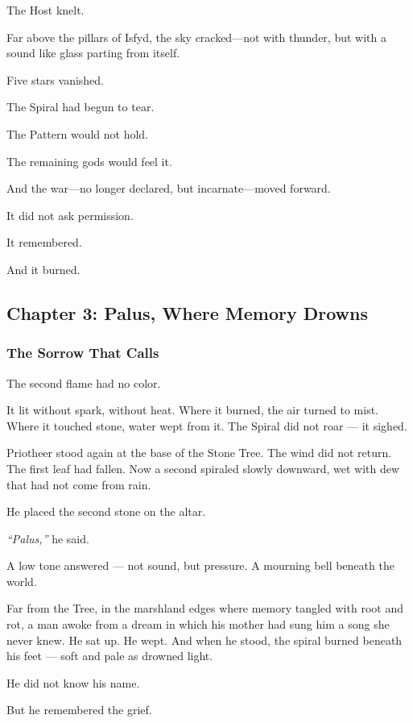 \documentclass[12pt]{article}
\begin{document}
The Host knelt.

Far above the pillars of Isfyd, the sky cracked—not with thunder, but with a sound like glass parting from itself.

Five stars vanished.

The Spiral had begun to tear.

The Pattern would not hold.

The remaining gods would feel it.

And the war—no longer declared, but incarnate—moved forward.

It did not ask permission.

It remembered.

And it burned.

\newpage

\subsection*{Chapter 3: Palus, Where Memory Drowns}

\vspace{.5in}

\subsubsection*{The Sorrow That Calls}

The second flame had no color.

It lit without spark, without heat. Where it burned, the air turned to mist. Where it touched stone, water wept from it. The Spiral did not roar — it sighed.

Priotheer stood again at the base of the Stone Tree. The wind did not return. The first leaf had fallen. Now a second spiraled slowly downward, wet with dew that had not come from rain.

He placed the second stone on the altar.

\textit{``Palus,''} he said.

A low tone answered — not sound, but pressure. A mourning bell beneath the world.

Far from the Tree, in the marshland edges where memory tangled with root and rot, a man awoke from a dream in which his mother had sung him a song she never knew. He sat up. He wept. And when he stood, the spiral burned beneath his feet — soft and pale as drowned light.

He did not know his name.

But he remembered the grief.
\end{document}
